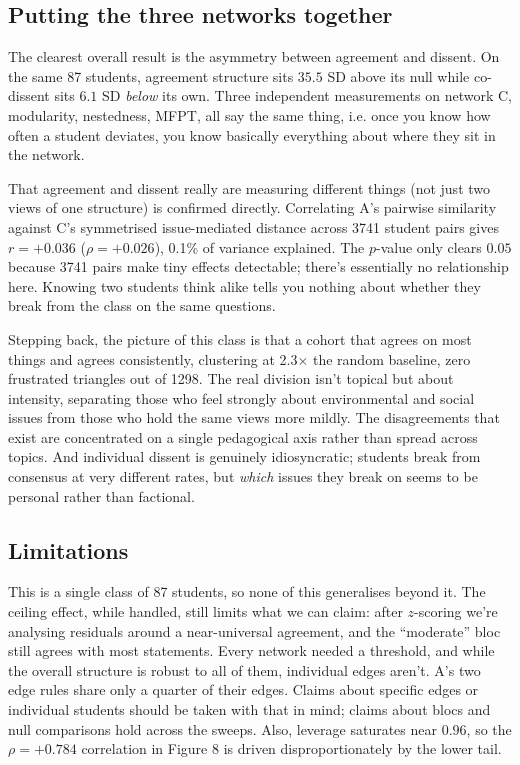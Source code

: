 \documentclass[10pt,a4paper]{article}
\begin{document}
\subsection{Putting the three networks together}

The clearest overall result is the asymmetry between agreement and dissent.
On the same 87 students, agreement structure sits $35.5$ SD above its null while
co-dissent sits $6.1$ SD \textit{below} its own. Three independent measurements on
network C, modularity, nestedness, MFPT, all say the same thing, i.e. once you know
how often a student deviates, you know basically everything about where they sit in the
network.

That agreement and dissent really are measuring different things (not just two views of one
structure) is confirmed directly. Correlating A's pairwise similarity against C's
symmetrised issue-mediated distance across 3741 student pairs gives
$r = +0.036$ ($\rho = +0.026$), 0.1\% of variance explained. The $p$-value only
clears $0.05$ because 3741 pairs make tiny effects detectable; there's essentially no
relationship here. Knowing two students think alike tells you nothing about whether
they break from the class on the same questions.

Stepping back, the picture of this class is that a cohort that agrees on most things and
agrees consistently, clustering at 2.3$\times$ the random baseline, zero frustrated
triangles out of 1298. The real division isn't topical but about intensity, separating
those who feel strongly about environmental and social issues from those who hold
the same views more mildly. The disagreements that exist are concentrated on a
single pedagogical axis rather than spread across topics. And individual dissent is
genuinely idiosyncratic; students break from consensus at very different rates, but
\textit{which} issues they break on seems to be personal rather than factional.

\subsection{Limitations}

This is a single class of 87 students, so none of this generalises beyond it.
The ceiling effect, while handled, still limits what we can claim: after
$z$-scoring we're analysing residuals around a near-universal agreement, and the
``moderate'' bloc still agrees with most statements. Every network needed a threshold, and
while the overall structure is robust to all of them, individual edges aren't. A's two
edge rules share only a quarter of their edges. Claims about specific edges or individual
students should be taken with that in mind; claims about blocs and null comparisons hold
across the sweeps. Also, leverage saturates near $0.96$, so the $\rho = +0.784$ correlation
in Figure 8 is driven disproportionately by the lower tail.
\end{document}
